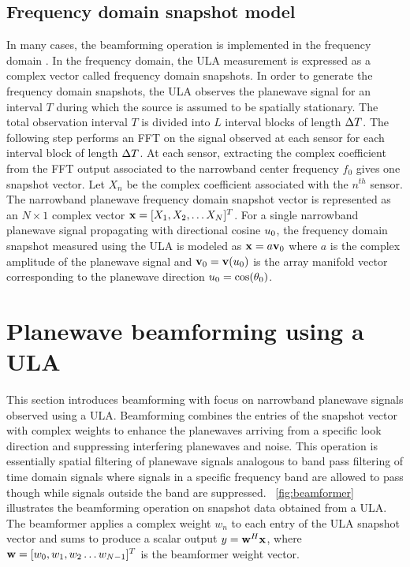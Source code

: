 \subsection{Frequency domain snapshot model}
\label{sec:freq-snapshot}
In many cases, the beamforming operation is implemented in the frequency
domain \cite[Sec.~5.2.1]{vtree2002oap}. In the frequency domain, the ULA
measurement is expressed as a complex vector called frequency domain
snapshots. In order to generate the frequency domain snapshots, the
ULA observes the planewave signal for an interval $T$ during which the
source is assumed to be spatially stationary. The total observation
interval $T$ is divided into $L$ interval blocks of length
$\Delta T$. The following step performs an FFT on the signal observed
at each sensor for each interval block of length $\Delta T$. At each sensor, extracting the
complex coefficient from the FFT output associated to the narrowband
center frequency $f_0$ gives one snapshot vector. Let $X_n$ be the
complex coefficient associated with the $n^{th}$ sensor. The
narrowband planewave frequency domain snapshot vector is represented
as an $N \times 1$ complex vector ${\bf x} = [X_1,X_2,\ldots X_N]^T$. For a
single narrowband planewave signal propagating with directional cosine
$u_0$, the frequency domain snapshot measured using the ULA is
modeled as ${\bf x} = a{\bf v}_0$ where $a$ is the complex amplitude of
the planewave signal and ${\bf v}_0 = {\bf v}(u_0)$ is the array manifold vector
corresponding to the planewave direction $u_0 = \cos(\theta_0)$.


\section{Planewave beamforming using a ULA}
\label{sec:beamforming} 
This section introduces beamforming with focus on narrowband planewave
signals observed using a ULA. Beamforming combines the entries of the
snapshot vector with complex weights to enhance the planewaves
arriving from a specific look direction and suppressing interfering
planewaves and noise. This operation is essentially spatial filtering
of planewave signals analogous to band pass filtering of time domain
signals where signals in a specific frequency band are allowed to pass
though while signals outside the band are suppressed. \figurename{}~\ref{fig:beamformer} illustrates the
beamforming operation on snapshot data obtained from a ULA. The beamformer applies a complex weight $w_n$ to
each entry of the ULA snapshot vector and sums to produce a scalar
output $ y = {\bf w}^H{\bf x}$, where ${\bf w} = [w_0, w_1, w_2\ldots w_{N-1}]^{T}$ is the beamformer weight vector.

